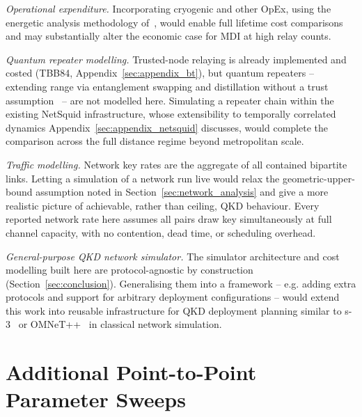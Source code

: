 \documentclass[12pt]{article}
\let\oldsection\section
\renewcommand{\section}{\clearpage\oldsection}
\begin{document}
\textit{Operational expenditure.} Incorporating cryogenic and other OpEx, using the energetic analysis methodology of~\cite{Yehia_2025}, would enable full lifetime cost comparisons and may substantially alter the economic case for MDI at high relay counts.

\textit{Quantum repeater modelling.} Trusted-node relaying is already implemented and costed (TBB84, Appendix~\ref{sec:appendix_bt}), but quantum repeaters -- extending range via entanglement swapping and distillation without a trust assumption~\cite{Briegel_1998, Azuma_2015} -- are not modelled here. Simulating a repeater chain within the existing NetSquid infrastructure, whose extensibility to temporally correlated dynamics Appendix~\ref{sec:appendix_netsquid} discusses, would complete the comparison across the full distance regime beyond metropolitan scale.

\textit{Traffic modelling.} Network key rates are the aggregate of all contained bipartite links. Letting a simulation of a network run live would relax the geometric-upper-bound assumption noted in Section~\ref{sec:network_analysis} and give a more realistic picture of achievable, rather than ceiling, QKD behaviour. Every reported network rate here assumes all pairs draw key simultaneously at full channel capacity, with no contention, dead time, or scheduling overhead.

\textit{General-purpose QKD network simulator.} The simulator architecture and cost modelling built here are protocol-agnostic by construction (Section~\ref{sec:conclusion}). Generalising them into a framework -- e.g. adding extra protocols and support for arbitrary deployment configurations -- would extend this work  into reusable infrastructure for QKD deployment planning similar to s-3~\cite{henderson2008network} or OMNeT++~\cite{varga2001omnet++} in classical network simulation.

\appendix
\section{Additional Point-to-Point Parameter Sweeps}
\label{sec:appendix_p2p}
\end{document}
